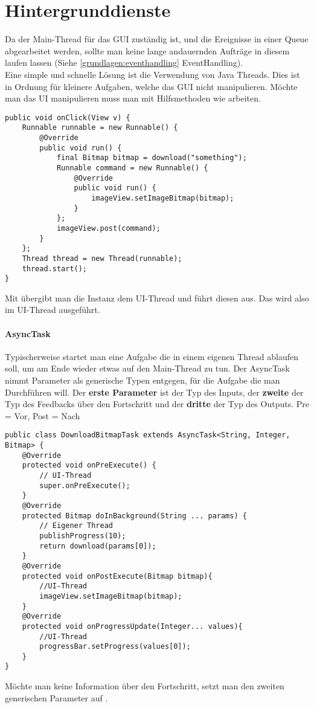 \section{Hintergrunddienste}
Da der Main-Thread für das GUI zuständig ist, und die Ereignisse in einer Queue abgearbeitet werden, sollte man keine lange andauernden Aufträge in diesem laufen lassen (Siehe \autoref{grundlagen:eventhandling} EventHandling).\\
Eine simple und schnelle Lösung ist die Verwendung von Java Threads. Dies ist in Ordnung für kleinere Aufgaben, welche das GUI nicht manipulieren. Möchte man das UI manipulieren muss man mit Hilfsmethoden wie  arbeiten.
\begin{lstlisting}
public void onClick(View v) {
    Runnable runnable = new Runnable() {
        @Override
        public void run() {
            final Bitmap bitmap = download("something");
            Runnable command = new Runnable() {
                @Override
                public void run() {
                    imageView.setImageBitmap(bitmap);
                }
            };
            imageView.post(command);
        }
    };
    Thread thread = new Thread(runnable);
    thread.start();
}
\end{lstlisting}
Mit  übergibt man die  Instanz dem UI-Thread und führt diesen aus. Das  wird also im UI-Thread ausgeführt.
\paragraph{AsyncTask} Typischerweise startet man eine Aufgabe die in einem eigenen Thread ablaufen soll, um am Ende wieder etwas auf den Main-Thread zu tun. Der AsyncTask nimmt Parameter als generische Typen entgegen, für die Aufgabe die man Durchführen will. Der \textbf{erste Parameter} ist der Typ des Inputs, der \textbf{zweite} der Typ des Feedbacks über den Fortschritt und der \textbf{dritte} der Typ des Outputs. Pre = Vor, Post = Nach
\begin{lstlisting}
public class DownloadBitmapTask extends AsyncTask<String, Integer, Bitmap> {
    @Override
    protected void onPreExecute() {
        // UI-Thread
        super.onPreExecute();
    }
    @Override
    protected Bitmap doInBackground(String ... params) {
        // Eigener Thread
        publishProgress(10);
        return download(params[0]);
    }
    @Override
    protected void onPostExecute(Bitmap bitmap){
        //UI-Thread
        imageView.setImageBitmap(bitmap);
    }
    @Override
    protected void onProgressUpdate(Integer... values){
        //UI-Thread
        progressBar.setProgress(values[0]);
    }
}
\end{lstlisting}
Möchte man keine Information über den Fortschritt, setzt man den zweiten generischen Parameter auf .
